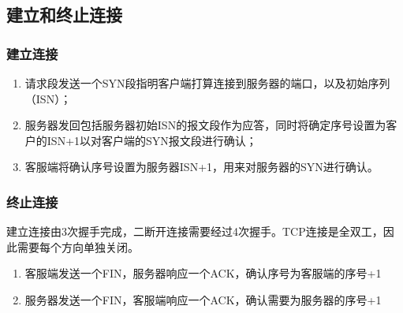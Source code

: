 \subsection{建立和终止连接}

\subsubsection{建立连接}

\begin{enumerate}
\item 请求段发送一个SYN段指明客户端打算连接到服务器的端口，以及初始序列（ISN）；

\item 服务器发回包括服务器初始ISN的报文段作为应答，同时将确定序号设置为客户的ISN+1以对客户端的SYN报文段进行确认；

\item 客服端将确认序号设置为服务器ISN+1，用来对服务器的SYN进行确认。

\end{enumerate}

\subsubsection{终止连接}

建立连接由3次握手完成，二断开连接需要经过4次握手。TCP连接是全双工，因此需要每个方向单独关闭。

\begin{enumerate}
\item 客服端发送一个FIN，服务器响应一个ACK，确认序号为客服端的序号+1

\item 服务器发送一个FIN，客服端响应一个ACK，确认需要为服务器的序号+1
\end{enumerate}

